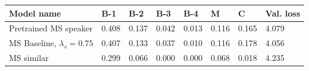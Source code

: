 \begin{table}[]
	\begin{tabularx}{\textwidth}{|X|l|l|l|l|l|l|l|}
		\hline
		\textbf{Model name}                                    & \textbf{B-1} & \textbf{B-2} & \textbf{B-3} & \textbf{B-4} & \textbf{M} & \textbf{C} & \textbf{Val. loss} \\ \hline
		Pretrained MS speaker                             & 0.408           & 0.137           & 0.042           & 0.013           & 0.116           & 0.165          & 4.079                    \\ \hline
		MS Baseline, $\lambda_s = 0.75$   & 0.407           & 0.133           & 0.037           & 0.010           & 0.116           & 0.178          & 4.056                    \\ \hline
		MS similar  &     0.299       &          0.066       &       0.000          &        0.000         &   0.068              &      0.018          &      4.235                    \\ \hline

\end{tabularx}
\end{table}
